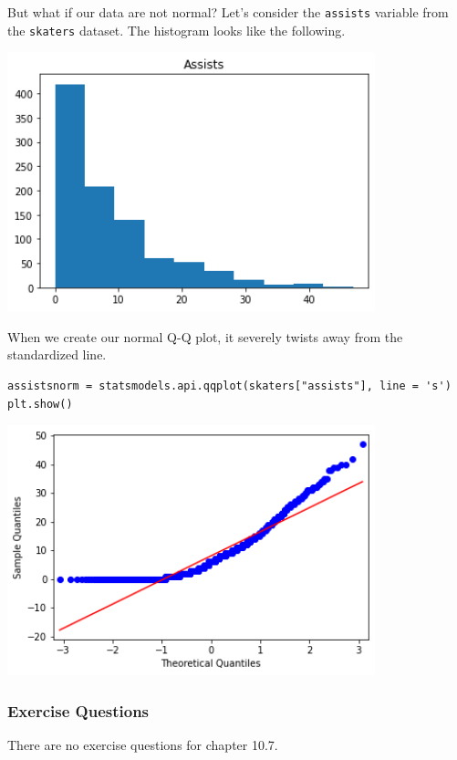 But what if our data are not normal? Let's consider the \verb|assists| variable from the \verb|skaters| dataset. The histogram looks like the following.

\includegraphics[width = 0.8\textwidth]{img/hist2.png}

When we create our normal Q-Q plot, it severely twists away from the standardized line.\par
\begin{lstlisting}[style=pippython]
assistsnorm = statsmodels.api.qqplot(skaters["assists"], line = 's')
plt.show()
\end{lstlisting}

\includegraphics[width = 0.8\textwidth]{img/hist8.png}

\subsubsection*{Exercise Questions}
There are no exercise questions for chapter 10.7.
